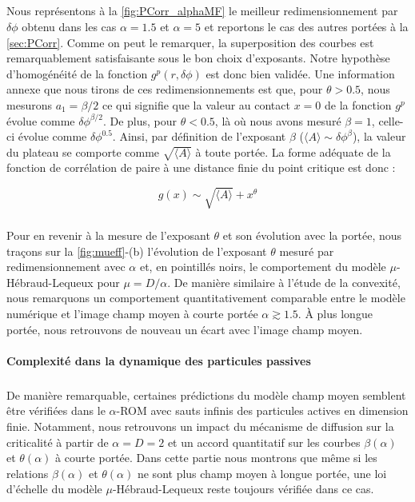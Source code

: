 \subparagraph{}Nous représentons à la \autoref{fig:PCorr_alphaMF} le meilleur redimensionnement par $\delta\phi$ obtenu dans les cas $\alpha = 1.5$ et $\alpha=5$ et reportons le cas des autres portées à la \autoref{sec:PCorr}. Comme on peut le remarquer, la superposition des courbes est remarquablement satisfaisante sous le bon choix d'exposants. Notre hypothèse d'homogénéité de la fonction $g^p(r, \delta\phi)$ est donc bien validée. Une information annexe que nous tirons de ces redimensionnements est que, pour $\theta>0.5$, nous mesurons $a_1 = \beta/2$ ce qui signifie que la valeur au contact $x=0$ de la fonction $g^p$ évolue comme $\delta\phi^{\beta/2}$. De plus, pour $\theta<0.5$, là où nous avons mesuré $\beta=1$, celle-ci évolue comme $\delta\phi^{0.5}$. Ainsi, par définition de l'exposant $\beta$ ($\langle A \rangle \sim \delta\phi^\beta$), la valeur du plateau se comporte comme $\sqrt{\langle A \rangle}$ à toute portée. La forme adéquate de la fonction de corrélation de paire à une distance finie du point critique est donc :

\begin{equation}
	g(x) \sim \sqrt{\langle A \rangle} + x^\theta
	\label{eq:scalinggx}
\end{equation}

\subparagraph{}Pour en revenir à la mesure de l'exposant $\theta$ et son évolution avec la portée, nous traçons sur la \autoref{fig:mueff}-(b) l'évolution de l'exposant $\theta$ mesuré par redimensionnement avec $\alpha$ et, en pointillés noirs, le comportement du modèle $\mu$-Hébraud-Lequeux pour $\mu = D / \alpha$. De manière similaire à l'étude de la convexité, nous remarquons un comportement quantitativement comparable entre le modèle numérique et l'image champ moyen à courte portée $\alpha \gtrsim 1.5$. \`A plus longue portée, nous retrouvons de nouveau un écart avec l'image champ moyen.

\paragraph{Complexité dans la dynamique des particules passives}

\subparagraph{}De manière remarquable, certaines prédictions du modèle champ moyen semblent être vérifiées dans le $\alpha$-ROM avec sauts infinis des particules actives en dimension finie. Notamment, nous retrouvons un impact du mécanisme de diffusion sur la criticalité à partir de $\alpha = D = 2$ et un accord quantitatif sur les courbes $\beta(\alpha)$ et $\theta(\alpha)$ à courte portée. Dans cette partie nous montrons que même si les relations $\beta(\alpha)$ et $\theta(\alpha)$ ne sont plus champ moyen à longue portée, une loi d'échelle du modèle $\mu$-Hébraud-Lequeux reste toujours vérifiée dans ce cas.

